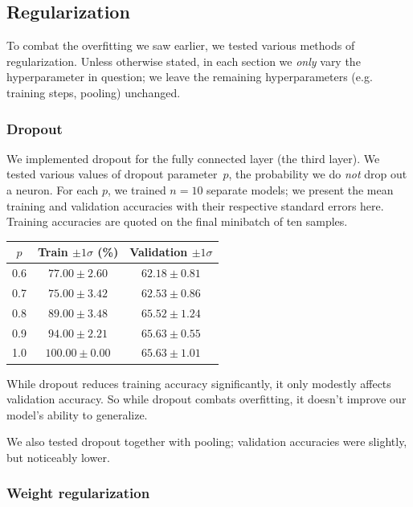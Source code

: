 \documentclass{article}
\begin{document}
\begin{multicols}{2}
\subsection{Regularization}

To combat the overfitting we saw earlier,
we tested various methods of regularization.
Unless otherwise stated,
in each section we \emph{only} vary the hyperparameter in question;
we leave the remaining hyperparameters (e.g. training steps, pooling) unchanged.


\subsubsection{Dropout}


We implemented dropout for the fully connected layer (the third layer).
We tested various values of dropout parameter~$p$,
the probability we do \emph{not} drop out a neuron.
For each $p$, we trained $n=10$ separate models;
we present the mean training and validation accuracies
with their respective standard errors here.
Training accuracies are quoted on the final minibatch of ten samples.
\begin{center}
    \begin{tabular}{c|cc}
        $p$ & Train $\pm 1 \sigma$ (\%) & Validation $\pm 1 \sigma$\\\hline
        0.6 &  $77.00 \pm 2.60$ & $62.18 \pm 0.81$ \\
        0.7 &  $75.00 \pm 3.42$ & $62.53 \pm 0.86$ \\
        0.8 &  $89.00 \pm 3.48$ & $65.52 \pm 1.24$ \\
        0.9 &  $94.00 \pm 2.21$ & $65.63 \pm 0.55$ \\
        1.0 & $100.00 \pm 0.00$ & $65.63 \pm 1.01$ \\
    \end{tabular}
\end{center}

While dropout reduces training accuracy significantly,
it only modestly affects validation accuracy.
So while dropout combats overfitting,
it doesn't improve our model's ability to generalize.

We also tested dropout together with pooling;
validation accuracies were slightly, but noticeably lower.


\subsubsection{Weight regularization}


\end{multicols}
\end{document}
